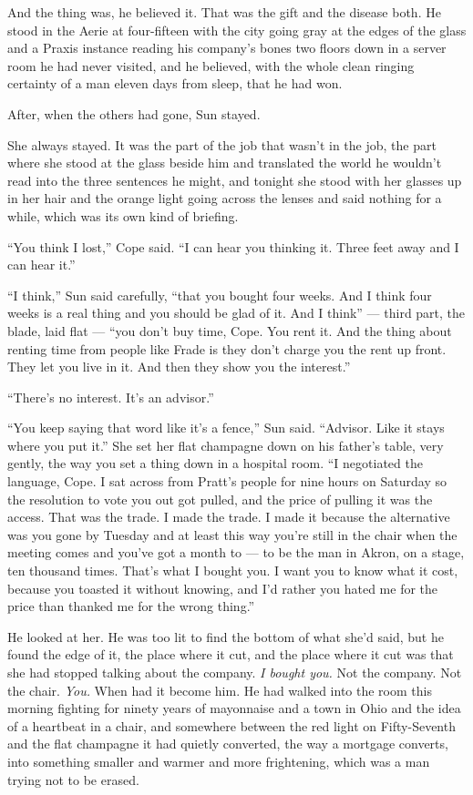 \documentclass[11pt,openany]{book}
\newcommand{\scenebreak}{\par\vspace{0.5\baselineskip}\begin{center}\textasteriskcentered\quad\textasteriskcentered\quad\textasteriskcentered\end{center}\vspace{0.5\baselineskip}\par}
\begin{document}
And the thing was, he believed it. That was the gift and the disease both. He stood in the Aerie at four-fifteen with the city going gray at the edges of the glass and a Praxis instance reading his company's bones two floors down in a server room he had never visited, and he believed, with the whole clean ringing certainty of a man eleven days from sleep, that he had won.


\scenebreak


After, when the others had gone, Sun stayed.

She always stayed. It was the part of the job that wasn't in the job, the part where she stood at the glass beside him and translated the world he wouldn't read into the three sentences he might, and tonight she stood with her glasses up in her hair and the orange light going across the lenses and said nothing for a while, which was its own kind of briefing.

``You think I lost,'' Cope said. ``I can hear you thinking it. Three feet away and I can hear it.''

``I think,'' Sun said carefully, ``that you bought four weeks. And I think four weeks is a real thing and you should be glad of it. And I think'' --- third part, the blade, laid flat --- ``you don't buy time, Cope. You rent it. And the thing about renting time from people like Frade is they don't charge you the rent up front. They let you live in it. And then they show you the interest.''

``There's no interest. It's an advisor.''

``You keep saying that word like it's a fence,'' Sun said. ``Advisor. Like it stays where you put it.'' She set her flat champagne down on his father's table, very gently, the way you set a thing down in a hospital room. ``I negotiated the language, Cope. I sat across from Pratt's people for nine hours on Saturday so the resolution to vote you out got pulled, and the price of pulling it was the access. That was the trade. I made the trade. I made it because the alternative was you gone by Tuesday and at least this way you're still in the chair when the meeting comes and you've got a month to --- to be the man in Akron, on a stage, ten thousand times. That's what I bought you. I want you to know what it cost, because you toasted it without knowing, and I'd rather you hated me for the price than thanked me for the wrong thing.''

He looked at her. He was too lit to find the bottom of what she'd said, but he found the edge of it, the place where it cut, and the place where it cut was that she had stopped talking about the company. \textit{I bought you.} Not the company. Not the chair. \textit{You.} When had it become him. He had walked into the room this morning fighting for ninety years of mayonnaise and a town in Ohio and the idea of a heartbeat in a chair, and somewhere between the red light on Fifty-Seventh and the flat champagne it had quietly converted, the way a mortgage converts, into something smaller and warmer and more frightening, which was a man trying not to be erased.
\end{document}
